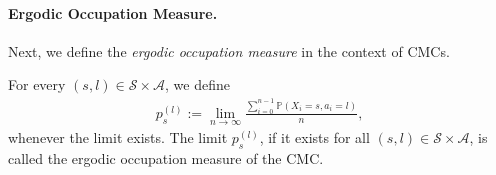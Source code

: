 \documentclass[twoside,11pt]{article}
\newcommand{\pow}[1]{^{(#1)}}%
\numberwithin{equation}{section}
\newcommand{\lp}{\left(}
\newcommand{\rp}{\right)}
\newcommand{\Pbb}{\mathbb{P}}
\newcommand{\prob}{\Pbb}
\begin{document}

\paragraph{Ergodic Occupation Measure.}
Next, we define the \emph{ergodic occupation measure} in the context of CMCs. 
\begin{definition}\label{def:semi-ergodic}
For every $(s,l) \in \mathcal S \times \mathcal A$, we define
\begin{align*}
p_s\pow l := \lim_{n\rightarrow\infty} \frac{\sum_{i=0}^{n-1} \prob\lp X_i=s,a_i=l \rp}{n},
\end{align*}
whenever the limit exists. 
The limit $p_s\pow l$, if it exists for all $(s,l) \in \mathcal S \times \mathcal A$, is called the ergodic occupation measure of the CMC.
\end{definition}
\end{document}
